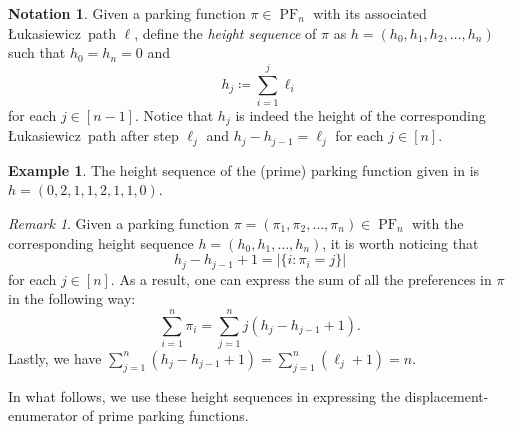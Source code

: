 \documentclass[12pt,reqno]{amsart}
\theoremstyle{definition}
\newtheorem{example}{Example}
\newtheorem{notation}{Notation}
\theoremstyle{remark}
\newtheorem{remark}{Remark}
\DeclareMathOperator{\PF}{PF}
\newcommand{\Luka}{\L ukasiewicz}
\begin{document}
\begin{notation}
    Given a parking function $\pi \in \PF_n$ with its associated \Luka~path $\ell$,  define the \textit{height sequence}  of $\pi$ as $h=(h_0,h_1,h_2,\ldots, h_n)$ such that $ h_0= h_n=0$ and
    \[h_j\coloneqq \sum_{i=1}^j \ell_i\] 
    for each $j\in [n-1]$. Notice that  $h_j$  is indeed the height of the corresponding \Luka~path after step $\ell_j$ and $h_{j}-h_{j-1}=\ell_j$ for each $j\in [n]$. 
\end{notation}

\begin{example}
     The height sequence of the (prime) parking function given in   is $h=(0,2,1,1,2,1,1,0)$.
\end{example}


\begin{remark}\label{rem:height_relations}
  Given a parking function $\pi=(\pi_1,\pi_2,\ldots, \pi_n) \in \PF_n$ with the corresponding height sequence $h=(h_0,h_1,\ldots, h_n)$, it is worth noticing that  
    \[h_{j}-h_{j-1}+ 1= |\{ i: \pi_{i}=j\}|\]
   for each $j\in [n]$. As a result, one can express the sum of all the preferences in $\pi$ in the following way:
   \[ \sum_{i=1}^{n}\pi_i = \sum_{j=1}^{n} j(h_j-h_{j-1}+1).\]
Lastly, we have $\displaystyle \sum_{j=1}^{n} (h_{j}-h_{j-1}+1) = \sum_{j=1}^{n} (\ell_{j} +1)= n$.
\end{remark}

    
In what follows, we use these height sequences in expressing the displacement-enumerator of prime parking functions.
\end{document}
